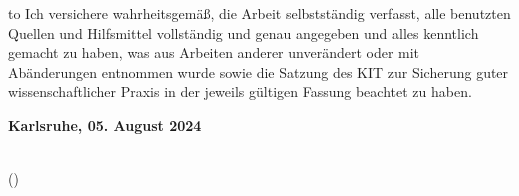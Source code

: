 
\thispagestyle{empty}
\null\vfill
\noindent\hbox to \textwidth{\hrulefill} 
%
% 
%
{Ich versichere wahrheitsgemäß, die Arbeit selbstständig verfasst, alle benutzten 
Quellen und Hilfsmittel vollständig und genau angegeben und alles kenntlich gemacht 
zu haben, was aus Arbeiten anderer unverändert oder mit Abänderungen entnommen wurde 
sowie die Satzung des KIT zur Sicherung guter wissenschaftlicher Praxis in der 
jeweils gültigen Fassung beachtet zu haben. }
 
 
\textbf{Karlsruhe, 05. August 2024}
\vspace{1.5cm}
 
\dotfill\hspace*{8.0cm}\\
\hspace*{2cm}(\theauthor) 
\cleardoublepage